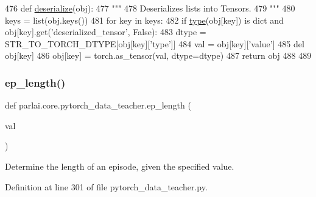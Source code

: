 \begin{DoxyCode}
476 \textcolor{keyword}{def }\hyperlink{namespaceparlai_1_1core_1_1pytorch__data__teacher_a0c6f08553514c14d037da194f9d112ae}{deserialize}(obj):
477     \textcolor{stringliteral}{"""}
478 \textcolor{stringliteral}{    Deserializes lists into Tensors.}
479 \textcolor{stringliteral}{    """}
480     keys = list(obj.keys())
481     \textcolor{keywordflow}{for} key \textcolor{keywordflow}{in} keys:
482         \textcolor{keywordflow}{if} \hyperlink{namespaceparlai_1_1agents_1_1tfidf__retriever_1_1build__tfidf_ad5dfae268e23f506da084a9efb72f619}{type}(obj[key]) \textcolor{keywordflow}{is} dict \textcolor{keywordflow}{and} obj[key].get(\textcolor{stringliteral}{'deserialized\_tensor'}, \textcolor{keyword}{False}):
483             dtype = STR\_TO\_TORCH\_DTYPE[obj[key][\textcolor{stringliteral}{'type'}]]
484             val = obj[key][\textcolor{stringliteral}{'value'}]
485             del obj[key]
486             obj[key] = torch.as\_tensor(val, dtype=dtype)
487     \textcolor{keywordflow}{return} obj
488 
489 
\end{DoxyCode}
\mbox{\label{namespaceparlai_1_1core_1_1pytorch__data__teacher_afbd22acd239efcdb6afb94db83ee3493}} 
\subsubsection{\texorpdfstring{ep\+\_\+length()}{ep\_length()}}
{\footnotesize\ttfamily def parlai.\+core.\+pytorch\+\_\+data\+\_\+teacher.\+ep\+\_\+length (\begin{DoxyParamCaption}\item[{}]{val }\end{DoxyParamCaption})}

\begin{DoxyVerb}Determine the length of an episode, given the specified value.
\end{DoxyVerb}
 

Definition at line 301 of file pytorch\+\_\+data\+\_\+teacher.\+py.


